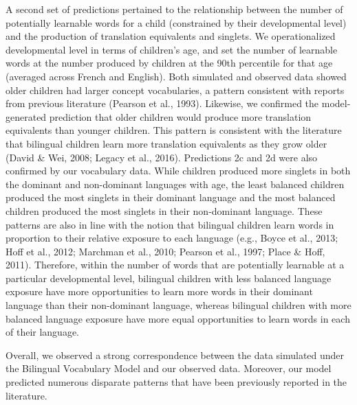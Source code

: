 \documentclass[
  english,
  ,man,floatsintext]{apa6}
\begin{document}
A second set of predictions pertained to the relationship between the number of potentially learnable words for a child (constrained by their developmental level) and the production of translation equivalents and singlets. We operationalized developmental level in terms of children's age, and set the number of learnable words at the number produced by children at the 90th percentile for that age (averaged across French and English). Both simulated and observed data showed older children had larger concept vocabularies, a pattern consistent with reports from previous literature (Pearson et al., 1993). Likewise, we confirmed the model-generated prediction that older children would produce more translation equivalents than younger children. This pattern is consistent with the literature that bilingual children learn more translation equivalents as they grow older (David \& Wei, 2008; Legacy et al., 2016). Predictions 2c and 2d were also confirmed by our vocabulary data. While children produced more singlets in both the dominant and non-dominant languages with age, the least balanced children produced the most singlets in their dominant language and the most balanced children produced the most singlets in their non-dominant language. These patterns are also in line with the notion that bilingual children learn words in proportion to their relative exposure to each language (e.g., Boyce et al., 2013; Hoff et al., 2012; Marchman et al., 2010; Pearson et al., 1997; Place \& Hoff, 2011). Therefore, within the number of words that are potentially learnable at a particular developmental level, bilingual children with less balanced language exposure have more opportunities to learn more words in their dominant language than their non-dominant language, whereas bilingual children with more balanced language exposure have more equal opportunities to learn words in each of their language.

Overall, we observed a strong correspondence between the data simulated under the Bilingual Vocabulary Model and our observed data. Moreover, our model predicted numerous disparate patterns that have been previously reported in the literature.
\end{document}
